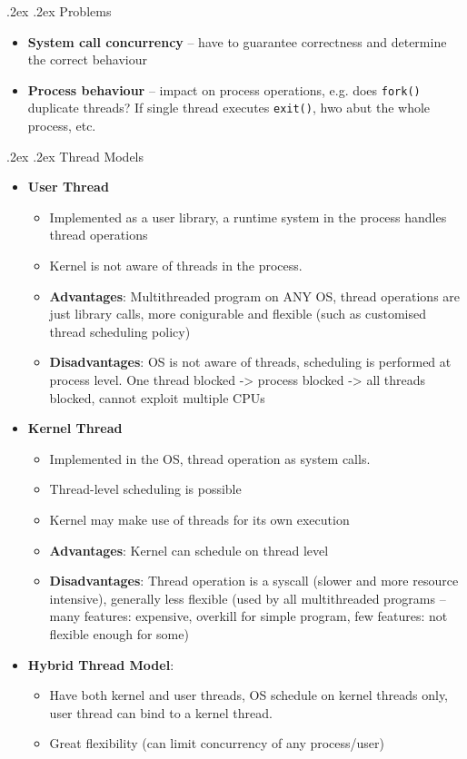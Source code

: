 \documentclass[10pt,landscape,a4paper]{article}
\makeatletter
\renewcommand{\subsection}{\@startsection{subsection}{1}{0mm}%
  {.2ex}%
  {.2ex}%
{\sffamily\bfseries}}
\makeatother
\begin{document}
\begin{multicols*}{4}
  \subsection{Problems}
  \begin{itemize}
    \item \textbf{System call concurrency} -- have to guarantee correctness and determine the correct behaviour
    \item \textbf{Process behaviour} -- impact on process operations, e.g. does \texttt{fork()} duplicate threads? If single thread executes \texttt{exit()}, hwo abut the whole process, etc.
  \end{itemize}
  \subsection{Thread Models}
  \begin{itemize}
    \item \textbf{User Thread}
          \begin{itemize}
            \item Implemented as a user library, a runtime system in the process handles thread operations
            \item Kernel is not aware of threads in the process.
            \item \textbf{Advantages}: Multithreaded program on ANY OS, thread operations are just library calls, more conigurable and flexible (such as customised thread scheduling policy)
            \item \textbf{Disadvantages}: OS is not aware of threads, scheduling is performed at process level. One thread blocked -> process blocked -> all threads blocked, cannot exploit multiple CPUs
          \end{itemize}
    \item \textbf{Kernel Thread}
          \begin{itemize}
            \item Implemented in the OS, thread operation as system calls.
            \item Thread-level scheduling is possible
            \item Kernel may make use of threads for its own execution
            \item \textbf{Advantages}: Kernel can schedule on thread level
            \item \textbf{Disadvantages}: Thread operation is a syscall (slower and more resource intensive), generally less flexible (used by all multithreaded programs -- many features: expensive, overkill for simple program, few features: not flexible enough for some)
          \end{itemize}
    \item \textbf{Hybrid Thread Model}:
          \begin{itemize}
            \item Have both kernel and user threads, OS schedule on kernel threads only, user thread can bind to a kernel thread.
            \item Great flexibility (can limit concurrency of any process/user)
          \end{itemize}
  \end{itemize}

\end{multicols*}
\end{document}
